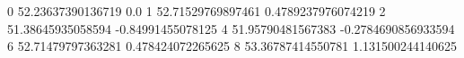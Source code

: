 0 52.23637390136719 0.0
1 52.71529769897461 0.4789237976074219
2 51.38645935058594 -0.84991455078125
4 51.95790481567383 -0.2784690856933594
6 52.71479797363281 0.478424072265625
8 53.36787414550781 1.131500244140625
